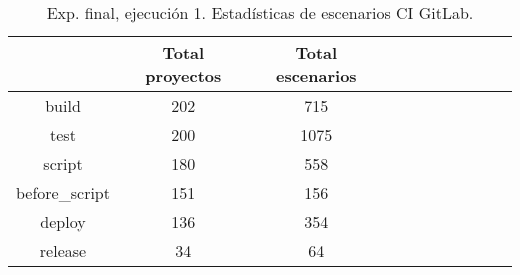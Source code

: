 \begin{table}[h]
  \centering
  \caption{Exp. final, ejecución 1. Estadísticas de escenarios CI GitLab.}
  \label{tab:tabla_f1_9}

\begin{footnotesize}
\renewcommand{\arraystretch}{1.5} %
\begin{tabular}{ccccccccccc}
  \hline
  {} &  Total proyectos &  Total escenarios \\
  \hline
  build                      &                 202 &           715 \\
  test                       &                 200 &          1075 \\
  script                     &                 180 &           558 \\
  before\_script              &                 151 &           156 \\
  deploy                     &                 136 &           354 \\
  release                    &                  34 &            64 \\

\end{tabular}
\end{footnotesize}
\end{table}
